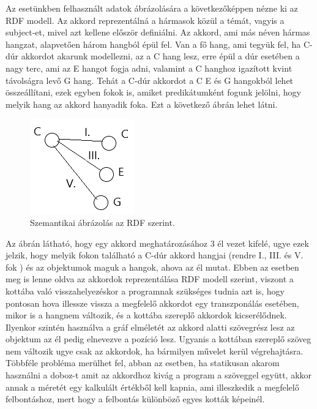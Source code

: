 Az esetünkben felhasznált adatok ábrázolására a következőképpen nézne ki az RDF modell. Az akkord reprezentálná a hármasok közül a témát, vagyis a subject-et, mivel azt kellene először definiálni. Az akkord, ami más néven hármas hangzat, alapvetően három hangból épül fel. Van a fő hang, ami tegyük fel, ha C-dúr akkordot akarunk modellezni, az a C hang lesz, erre épül a dúr esetében a nagy terc, ami az E hangot fogja adni, valamint a C hanghoz igazított kvint távolságra levő G hang. Tehát a C-dúr akkordot a C E és G hangokból lehet összeállítani, ezek egyben fokok is, amiket predikátumként fogunk jelölni, hogy melyik hang az akkord hanyadik foka. Ezt a következő ábrán lehet látni.
\begin{figure}[h]
	\includegraphics[scale=1]{images/rdf_graph.png}
	\caption{Szemantikai ábrázolás az RDF szerint.}
	\label{fig:graph1}
\end{figure}
Az ábrán látható, hogy egy akkord meghatározásához 3 él vezet kifelé, ugye ezek jelzik, hogy melyik fokon található a C-dúr akkord hangjai (rendre I., III. és V. fok ) és az objektumok maguk a hangok, ahova az él mutat. Ebben az esetben meg is lenne oldva az akkordok reprezentálása RDF modell szerint, viszont a kottába való visszahelyezéskor a programnak szükséges tudnia azt is, hogy pontosan hova illessze vissza a megfelelő akkordot egy transzponálás esetében, mikor is a hangnem változik, és a kottába szereplő akkordok kicserélődnek. 
Ilyenkor szintén használva a gráf elméletét az akkord alatti szövegrész lesz az objektum az él pedig elnevezve a pozíció lesz. Ugyanis a kottában szereplő szöveg nem változik ugye csak az akkordok, ha bármilyen művelet kerül végrehajtásra. Többféle probléma merülhet fel, abban az esetben, ha statikusan akarom használni a doboz-t amit az akkordhoz kivág a program a szöveggel együtt, akkor annak a méretét egy kalkulált értékből kell kapnia, ami illeszkedik a megfelelő felbontáshoz, mert hogy a felbontás különböző egyes kották képeinél.


